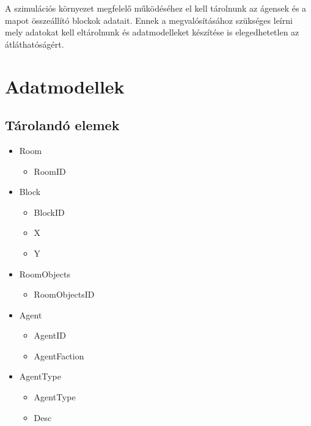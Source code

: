 
A szimulációs környezet megfelelő működéséhez el kell tárolnunk az ágensek és a mapot összeállító blockok adatait.
Ennek a megvalósításához szükséges leírni mely adatokat kell eltárolnunk és adatmodelleket készítése is elegedhetetlen az átláthatóságért.

\section{Adatmodellek}

\subsection{Tárolandó elemek}

\begin{itemize}
    \item Room

    \begin{itemize}
        \item RoomID
    \end{itemize}

    \item Block

    \begin{itemize}
        \item BlockID
        \item X
        \item Y
    \end{itemize}

    \item RoomObjects

    \begin{itemize}
        \item RoomObjectsID
    \end{itemize}

    \item Agent

    \begin{itemize}
        \item AgentID
        \item AgentFaction
    \end{itemize}

    \item AgentType

    \begin{itemize}
        \item AgentType
        \item Desc
    \end{itemize}


\end{itemize}
